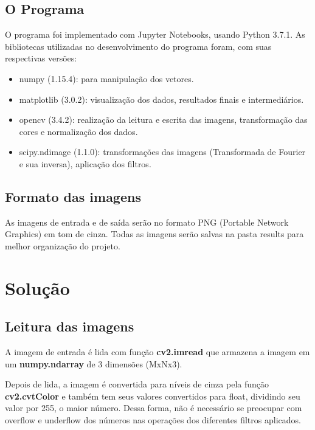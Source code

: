 \documentclass{article}
\begin{document}
\subsection{O Programa}

O programa foi implementado com Jupyter Notebooks, usando Python 3.7.1. As bibliotecas utilizadas no desenvolvimento do programa foram, com suas respectivas versões: 

\begin{itemize}
    \item numpy (1.15.4): para manipulação dos vetores.

    \item matplotlib (3.0.2): visualização dos dados, resultados finais e intermediários.

    \item opencv (3.4.2): realização da leitura e escrita das imagens, transformação das cores e normalização dos dados.

    \item scipy.ndimage (1.1.0): transformações das imagens (Transformada de Fourier e sua inversa), aplicação dos filtros.
\end{itemize}

\subsection{Formato das imagens}

As imagens de entrada e de saída serão no formato PNG (Portable Network Graphics) em tom de cinza. Todas as imagens serão salvas na pasta results para melhor organização do projeto. 

\section{Solução}

\subsection{Leitura das imagens}

A imagem de entrada é lida com função \textbf{cv2.imread} que armazena a imagem em um \textbf{numpy.ndarray} de 3 dimensões (MxNx3).

Depois de lida, a imagem é convertida para níveis de cinza pela função \textbf{cv2.cvtColor} e também tem seus valores convertidos para float, dividindo seu valor por 255, o maior número. Dessa forma, não é necessário se preocupar com overflow e underflow dos números nas operações dos diferentes filtros aplicados.
\end{document}
